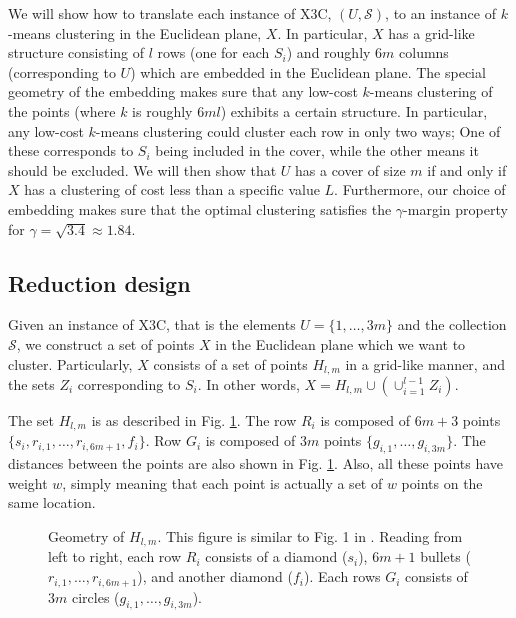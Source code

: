 \documentclass[12pt]{article}
\newcommand{\mc}{\mathcal}
\begin{document}
We will show how to translate each instance of X3C, $(U,\mc S)$, to an instance of $k$-means clustering in the Euclidean plane, $X$. In particular, $X$ has a grid-like structure consisting of $l$ rows (one for each $S_i$) and roughly $6m$ columns (corresponding to $U$) which are embedded in the Euclidean plane. The special geometry of the embedding makes sure that any low-cost $k$-means clustering of the points (where $k$ is roughly $6ml$) exhibits a certain structure. In particular, any low-cost $k$-means clustering could cluster each row in only two ways; One of these corresponds to $S_i$ being included in the cover, while the other means it should be excluded. We will then show that $U$ has a cover of size $m$ if and only if $X$ has a clustering of cost less than a specific value $L$. Furthermore, our choice of embedding makes sure that the optimal clustering satisfies the $\gamma$-margin property for $\gamma=\sqrt{3.4} \approx 1.84$.

  

\subsection{Reduction design}

Given an instance of X3C, that is the elements $U = \{1, \ldots, 3m\}$ and the collection $\mc S$, we construct a set of points $X$ in the Euclidean plane which we want to cluster. Particularly, $X$ consists of a set of points $H_{l,m}$ in a grid-like manner, and the sets $Z_i$ corresponding to $S_i$. In other words, $X = H_{l,m} \cup (\cup_{i=1}^{l-1} Z_i)$. 

The set $H_{l,m}$ is as described in Fig. \ref{fig:lowerBoundComponent}. The row $R_i$ is composed of $6m + 3$ points $\{s_i, r_{i, 1}, \ldots, r_{i, 6m+1}, f_i\}$. Row $G_i$ is composed of $3m$ points $\{g_{i,1}, \ldots, g_{i, 3m}\}$. The distances between the points are also shown in Fig. \ref{fig:lowerBoundComponent}. Also, all these points have weight $w$, simply meaning that each point is actually a set of $w$ points on the same location.

\begin{figure}
  	\centering
    
    \caption{Geometry of $H_{l,m}$. This figure is similar to Fig. 1 in \cite{vattani2009hardness}. Reading from left to right, each row $R_i$ consists of a diamond ($s_i$), $6m+1$ bullets ($r_{i,1},\ldots,r_{i,6m+1}$), and another diamond ($f_i$). Each rows $G_i$ consists of $3m$ circles ($g_{i,1}, \ldots, g_{i,3m}$).}
    \label{fig:lowerBoundComponent}
\end{figure}
\end{document}
